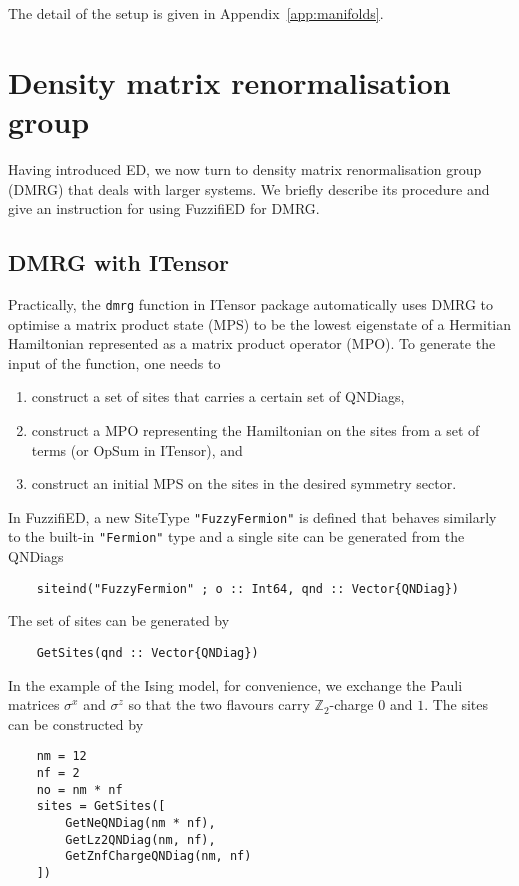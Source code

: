 \documentclass{timesjhep}
\begin{document}
The detail of the setup is given in Appendix~\ref{app:manifolds}.

\section{Density matrix renormalisation group}
\label{sec:dmrg}

Having introduced ED, we now turn to density matrix renormalisation group (DMRG) that deals with larger systems. We briefly describe its procedure  and give an instruction for using FuzzifiED for DMRG. 

\subsection{DMRG with ITensor}

Practically, the \lstinline|dmrg| function in ITensor package automatically uses DMRG to optimise a matrix product state (MPS) to be the lowest eigenstate of a Hermitian Hamiltonian represented as a matrix product operator (MPO). To generate the input of the function, one needs to 
\begin{enumerate}
    \item construct a set of sites that carries a certain set of QNDiags,
    \item construct a MPO representing the Hamiltonian on the sites from a set of terms (or OpSum in ITensor), and 
    \item construct an initial MPS on the sites in the desired symmetry sector.
\end{enumerate}

In FuzzifiED, a new SiteType \lstinline|"FuzzyFermion"| is defined that behaves similarly to the built-in \lstinline|"Fermion"| type and a single site can be generated from the QNDiags
\begin{lstlisting}
    siteind("FuzzyFermion" ; o :: Int64, qnd :: Vector{QNDiag})
\end{lstlisting}
The set of sites can be generated by 
\begin{lstlisting}
    GetSites(qnd :: Vector{QNDiag})
\end{lstlisting}

In the example of the Ising model, for convenience, we exchange the Pauli matrices $\sigma^x$ and $\sigma^z$ so that the two flavours carry $\mathbb{Z}_2$-charge $0$ and $1$. The sites can be constructed by 
\begin{lstlisting}
    nm = 12
    nf = 2
    no = nm * nf
    sites = GetSites([
        GetNeQNDiag(nm * nf), 
        GetLz2QNDiag(nm, nf),
        GetZnfChargeQNDiag(nm, nf)
    ])
\end{lstlisting}
\end{document}
